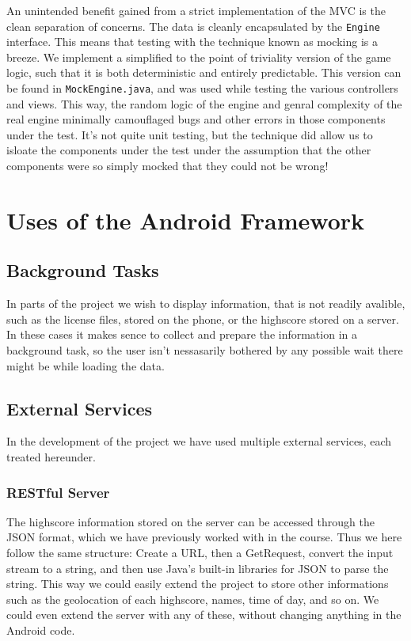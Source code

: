 \documentclass[a4paper, 12pt]{article}
\newcommand{\code}[1]{\texttt{#1}}
\begin{document}
An unintended benefit gained from a strict implementation of the MVC
is the clean separation of concerns. The data is cleanly encapsulated
by the \code{Engine} interface. This means that testing with the
technique known as mocking is a breeze. We implement a simplified to
the point of triviality version of the game logic, such that it is
both deterministic and entirely predictable. This version can be found
in \code{MockEngine.java}, and was used while testing the various
controllers and views. This way, the random logic of the engine and
genral complexity of the real engine minimally camouflaged bugs and
other errors in those components under the test. It's not quite unit
testing, but the technique did allow us to isloate the components
under the test under the assumption that the other components were so
simply mocked that they could not be wrong!

\section{Uses of the Android Framework}
\subsection{Background Tasks}
In parts of the project we wish to display information, that is not
readily avalible, such as the license files, stored on the phone, or
the highscore stored on a server. In these cases it makes sence to
collect and prepare the information in a background task, so the user
isn't nessasarily bothered by any possible wait there might be while
loading the data.

\subsection{External Services}
In the development of the project we have used multiple external
services, each treated hereunder.

\subsubsection{RESTful Server}
The highscore information stored on the server can be accessed through
the JSON format, which we have previously worked with in the
course. Thus we here follow the same structure: Create a URL, then a
GetRequest, convert the input stream to a string, and then use Java's
built-in libraries for JSON to parse the string. This way we could
easily extend the project to store other informations such as the
geolocation of each highscore, names, time of day, and so on. We could
even extend the server with any of these, without changing anything in
the Android code.
\end{document}
